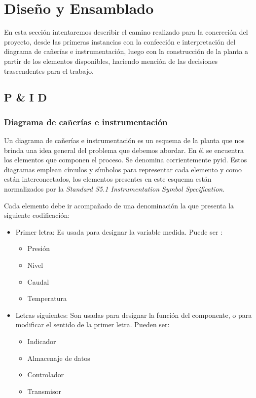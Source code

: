 \chapter{Diseño y Ensamblado}
\label{ch:DisenoEnsamblado}
En esta sección intentaremos describir el camino realizado para la concreción del proyecto, desde 
las primeras instancias con la confección e interpretación del diagrama de cañerías e instrumentación, 
luego con la construcción de la planta a partir de los elementos disponibles, haciendo mención de 
las decisiones trascendentes para el trabajo.

\section{P \& I D}
\label{sec:p&id}

\subsection{Diagrama de cañerías e instrumentación}
Un diagrama de cañerías e instrumentación es un esquema de la planta que nos brinda una idea 
general del problema que debemos abordar. 
En él se encuentra los elementos que componen el proceso. 
Se denomina corrientemente \gls{pyid}.
Estos diagramas emplean círculos y símbolos para representar cada elemento y como están interconectados, 
los elementos presentes en este esquema están normalizados por la \emph{Standard S5.1
Instrumentation Symbol Specification}.

Cada elemento debe ir acompañado de una denominación la que presenta la siguiente codificación:


\begin{itemize}  
 \item Primer letra: 
 Es usada para designar la variable medida. Puede ser :
 \begin{itemize}
  \item Presión
  \item Nivel
  \item Caudal
  \item Temperatura
 \end{itemize}

 \item Letras siguientes:
 Son usadas para designar la función del componente, o para modificar el sentido de la primer letra.
 Pueden ser:
 \begin{itemize}
  \item Indicador
  \item Almacenaje de datos
  \item Controlador
  \item Transmisor
 \end{itemize}
\end{itemize}

